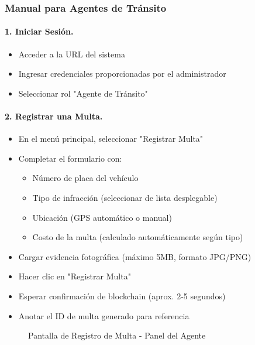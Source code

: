\subsubsection{Manual para Agentes de Tránsito}

\paragraph{1. Iniciar Sesión.}
\begin{itemize}
    \item Acceder a la URL del sistema
    \item Ingresar credenciales proporcionadas por el administrador
    \item Seleccionar rol "Agente de Tránsito"
\end{itemize}

\paragraph{2. Registrar una Multa.}
\begin{itemize}
    \item En el menú principal, seleccionar "Registrar Multa"
    \item Completar el formulario con:
    \begin{itemize}
        \item Número de placa del vehículo
        \item Tipo de infracción (seleccionar de lista desplegable)
        \item Ubicación (GPS automático o manual)
        \item Costo de la multa (calculado automáticamente según tipo)
    \end{itemize}
    \item Cargar evidencia fotográfica (máximo 5MB, formato JPG/PNG)
    \item Hacer clic en "Registrar Multa"
    \item Esperar confirmación de blockchain (aprox. 2-5 segundos)
    \item Anotar el ID de multa generado para referencia
\end{itemize}

\begin{figure}[htbp]
    \centering
    \caption{Pantalla de Registro de Multa - Panel del Agente}
\end{figure}

